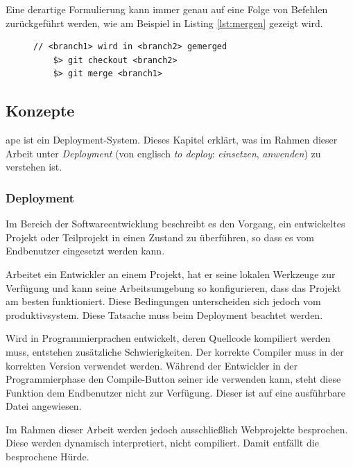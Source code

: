 Eine derartige Formulierung kann immer genau auf eine Folge von Befehlen zurückgeführt werden, wie am Beispiel in Listing \ref{lst:mergen} gezeigt wird.

\begin{figure}
	\begin{lstlisting}[caption=Mergen von zwei Branches,label={lst:mergen}]
	// <branch1> wird in <branch2> gemerged
	$> git checkout <branch2>
	$> git merge <branch1>
	\end{lstlisting}
\end{figure}



\subsection{Konzepte} %
\label{sub:konzepte}

\gls{ape} ist ein Deployment-System. Dieses Kapitel erklärt, was im Rahmen dieser Arbeit unter \emph{Deployment} (von englisch \emph{to deploy}: \emph{einsetzen}, \emph{anwenden}) zu verstehen ist.

\subsubsection{Deployment} %
\label{ssub:deployment}

Im Bereich der Softwareentwicklung beschreibt es den Vorgang, ein entwickeltes Projekt oder Teilprojekt in einen Zustand zu überführen, so dass es vom Endbenutzer eingesetzt werden kann.

Arbeitet ein Entwickler an einem Projekt, hat er seine lokalen Werkzeuge zur Verfügung und kann seine Arbeitsumgebung so konfigurieren, dass das Projekt am besten funktioniert. Diese Bedingungen unterscheiden sich jedoch vom \gls{produktivsystem}. Diese Tatsache muss beim Deployment beachtet werden.

Wird in Programmierprachen entwickelt, deren Quellcode kompiliert werden muss, entstehen zusätzliche Schwierigkeiten. Der korrekte Compiler muss in der korrekten Version verwendet werden. Während der Entwickler in der Programmierphase den Compile-Button seiner \gls{ide} verwenden kann, steht diese Funktion dem Endbenutzer nicht zur Verfügung. Dieser ist auf eine ausführbare Datei angewiesen.

Im Rahmen dieser Arbeit werden jedoch ausschließlich Webprojekte besprochen. Diese werden dynamisch interpretiert, nicht compiliert. Damit entfällt die besprochene Hürde.

